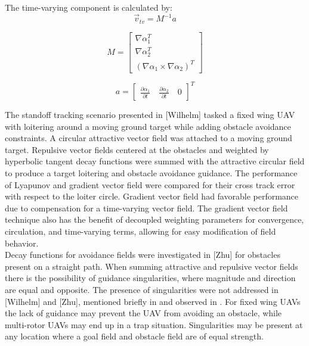 \documentclass[conf]{new-aiaa}
\begin{document}
The time-varying component is calculated by:
\begin{equation}
\label{tv}
\vec{v}_{tv} = M^{-1}a
\end{equation}

\begin{equation}
\label{mMatrix}
M =\begin{bmatrix}
\nabla\alpha_1^T \\
\nabla\alpha_2^T \\
(\nabla\alpha_1 \times \nabla\alpha_2)^T
\end{bmatrix}
\end{equation}

\begin{equation}
\label{aVector}
a =\begin{bmatrix}
\frac{\partial \alpha_1}{\partial t} \quad   \frac{\partial \alpha_2}{\partial t} \quad   0
\end{bmatrix}^T
\end{equation}





The standoff tracking scenario presented in [Wilhelm] tasked a fixed wing UAV with loitering around a moving ground target while adding obstacle avoidance constraints. A circular attractive vector field was attached to a moving ground target. Repulsive vector fields centered at the obstacles and weighted by hyperbolic tangent decay functions were summed with the attractive circular field to produce a target loitering and obstacle avoidance guidance. The performance of Lyapunov \cite{frew_cooperative_2007} and gradient vector field \cite{goncalves_artificial_2009,goncalves_circulation_2010,goncalves_vector_2010} were compared for their cross track error with respect to the loiter circle. Gradient vector field had favorable performance due to compensation for a time-varying vector field. The gradient vector field technique also has the benefit of decoupled weighting parameters for convergence, circulation, and time-varying terms, allowing for easy modification of field behavior. \\

Decay functions for avoidance fields were investigated in [Zhu] for obstacles present on a straight path. When summing attractive and repulsive vector fields there is the possibility of guidance singularities, where magnitude and direction are equal and opposite. The presence of singularities were not addressed in [Wilhelm] and [Zhu], mentioned briefly in \cite{nelson_cooperative_2005} and observed in \cite{panagou_motion_2014}. For fixed wing UAVs the lack of guidance may prevent the UAV from avoiding an obstacle, while multi-rotor UAVs may end up in a trap situation. Singularities may be present at any location where a goal field and obstacle field are of equal strength. \\
\end{document}
